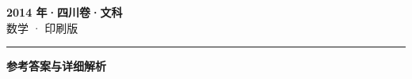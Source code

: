 \documentclass[zihao=5, a4paper]{ctexart}
\begin{document}
\begin{center}
  {\Large\bfseries 2014 年·四川卷·文科}\\[4pt]
  {\large 数学 · 印刷版}
\end{center}
\medskip
{}

\par\bigskip\hrule\bigskip
{}
\Needspace{0.55\textheight}
\begin{center}{\large\bfseries 参考答案与详细解析}\end{center}
\smallskip

\end{document}
